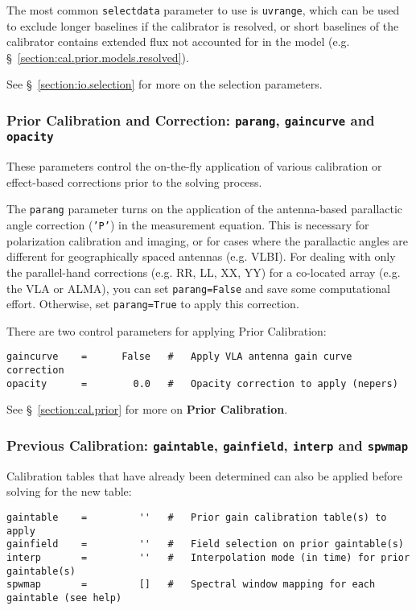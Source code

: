 The most common {\tt selectdata} parameter to use is {\tt uvrange},
which can be used to exclude longer baselines if the calibrator is
resolved, or short baselines of the calibrator contains extended flux
not accounted for in the model 
(e.g. \S~\ref{section:cal.prior.models.resolved}).

See \S~\ref{section:io.selection} for more on the selection parameters.

\subsubsection{Prior Calibration and Correction: {\tt parang}, {\tt gaincurve} and
   {\tt opacity} }
\label{section:cal.solve.pars.prior}

These parameters control the on-the-fly application of various
calibration or effect-based corrections prior to the solving process.

The {\tt parang} parameter turns on the application of the
antenna-based parallactic angle correction ({\tt 'P'}) in the
measurement equation.  This is necessary for polarization calibration
and imaging, or for cases where the parallactic angles are different
for geographically spaced antennas (e.g. VLBI).  For dealing with only
the parallel-hand corrections (e.g. RR, LL, XX, YY) for a co-located
array (e.g. the VLA or ALMA), you can set {\tt parang=False} and save
some computational effort.  Otherwise, set {\tt parang=True} to apply
this correction.

There are two control parameters for applying Prior Calibration:
\small
\begin{verbatim}
gaincurve    =      False   #   Apply VLA antenna gain curve correction
opacity      =        0.0   #   Opacity correction to apply (nepers)
\end{verbatim}
\normalsize

See \S~\ref{section:cal.prior} for more on {\bf Prior Calibration}.

\subsubsection{Previous Calibration: {\tt gaintable},
{\tt gainfield}, {\tt interp} and {\tt spwmap} }
\label{section:cal.solve.pars.previous}

Calibration tables that have already been determined can also be
applied before solving for the new table:
\small
\begin{verbatim}
gaintable    =         ''   #   Prior gain calibration table(s) to apply
gainfield    =         ''   #   Field selection on prior gaintable(s)
interp       =         ''   #   Interpolation mode (in time) for prior gaintable(s)
spwmap       =         []   #   Spectral window mapping for each gaintable (see help)
\end{verbatim}
\normalsize

